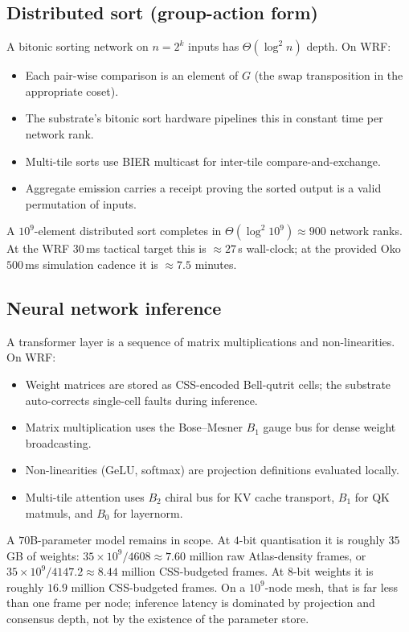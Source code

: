 \documentclass[11pt,letterpaper]{article}
\theoremstyle{remark}
\begin{document}
\subsection{Distributed sort (group-action form)}

A bitonic sorting network on $n = 2^k$ inputs has $\Theta(\log^2 n)$ depth. On WRF:
\begin{itemize}[leftmargin=2em,nosep]
\item Each pair-wise comparison is an element of $G$ (the swap transposition in the
appropriate coset).
\item The substrate's bitonic sort hardware pipelines this in constant time per network
rank.
\item Multi-tile sorts use BIER multicast for inter-tile compare-and-exchange.
\item Aggregate emission carries a receipt proving the sorted output is a valid
permutation of inputs.
\end{itemize}
A $10^9$-element distributed sort completes in $\Theta(\log^2 10^9) \approx 900$ network
ranks. At the WRF $30$\,ms tactical target this is $\approx 27$\,s wall-clock; at the
provided Oko $500$\,ms simulation cadence it is $\approx 7.5$ minutes.

\subsection{Neural network inference}

A transformer layer is a sequence of matrix multiplications and non-linearities. On WRF:
\begin{itemize}[leftmargin=2em,nosep]
\item Weight matrices are stored as CSS-encoded Bell-qutrit cells; the substrate
auto-corrects single-cell faults during inference.
\item Matrix multiplication uses the Bose--Mesner $B_1$ gauge bus for dense weight
broadcasting.
\item Non-linearities (GeLU, softmax) are projection definitions evaluated locally.
\item Multi-tile attention uses $B_2$ chiral bus for KV cache transport, $B_1$ for QK
matmuls, and $B_0$ for layernorm.
\end{itemize}
A $70$B-parameter model remains in scope. At $4$-bit quantisation it is roughly
$35$\,GB of weights: $35\times 10^9 / 4608 \approx 7.60$ million raw Atlas-density frames,
or $35\times 10^9/4147.2 \approx 8.44$ million CSS-budgeted frames. At $8$-bit weights it
is roughly $16.9$ million CSS-budgeted frames. On a $10^9$-node mesh, that is far less
than one frame per node; inference latency is dominated by projection and consensus depth,
not by the existence of the parameter store.
\end{document}
